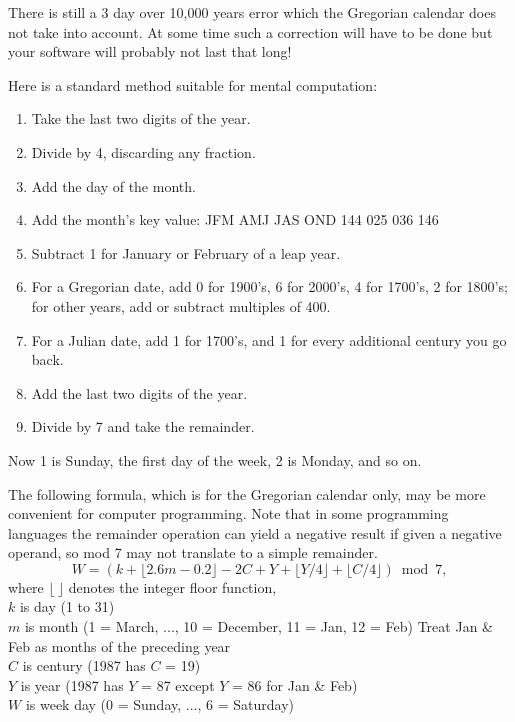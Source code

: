 There is still a 3 day over 10,000 years error which the Gregorian
calendar does not take into account.  At some time such a correction
will have to be done but your software will probably not last that long!

Here is a standard method suitable for mental computation:


\begin{enumerate}
  \item Take the last two digits of the year.
  \item Divide by 4, discarding any fraction.
  \item Add the day of the month.
  \item Add the month's key value: JFM AMJ JAS OND
                                   144 025 036 146
  \item Subtract 1 for January or February of a leap year.
  \item For a Gregorian date, add 0 for 1900's, 6 for 2000's, 4 for
  1700's, 2 for 1800's; for other years, add or subtract multiples of
  400.
  \item For a Julian date, add 1 for 1700's, and 1 for every additional
  century you go back.
  \item Add the last two digits of the year.
  \item Divide by 7 and take the remainder.
\end{enumerate}

Now 1 is Sunday, the first day of the week, 2 is Monday, and so on.

The following formula, which is for the Gregorian calendar only, may be
more convenient for computer programming.  Note that in some programming
languages the remainder operation can yield a negative result if given a
negative operand, so mod 7 may not translate to a simple remainder.
\[
W = (k + \lfloor 2.6m - 0.2\rfloor - 2C + Y + \lfloor Y/4 \rfloor +
\lfloor C/4\rfloor) \bmod 7,
\]
where $\lfloor\ \rfloor$ denotes the integer floor function,\\
$k$ is day (1 to 31)\\
$m$ is month (1 = March, ..., 10 = December, 11 = Jan, 12 = Feb)
Treat Jan \& Feb as months of the preceding year\\
$C$ is century (1987 has $C$ = 19)\\
$Y$ is year    (1987 has $Y$ = 87 except $Y$ = 86 for Jan \& Feb)\\
$W$ is week day (0 = Sunday, ..., 6 = Saturday)\\

